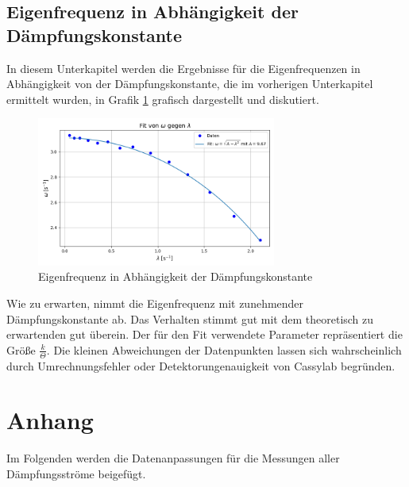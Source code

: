 \documentclass{article}
\begin{document}
\subsection{Eigenfrequenz in Abhängigkeit der Dämpfungskonstante}

In diesem Unterkapitel werden die Ergebnisse für die Eigenfrequenzen in Abhängigkeit von der Dämpfungskonstante, die im vorherigen Unterkapitel ermittelt wurden, in Grafik \ref{fig:Eigenfrequenz} grafisch dargestellt und diskutiert.

\begin{figure}[H]
    \centering
    \includegraphics[width=0.7\textwidth]{Figure_10.png}
    \caption{Eigenfrequenz in Abhängigkeit der Dämpfungskonstante}
    \label{fig:Eigenfrequenz}
\end{figure}

Wie zu erwarten, nimmt die Eigenfrequenz mit zunehmender Dämpfungskonstante ab. Das Verhalten stimmt gut mit dem theoretisch zu erwartenden gut überein. Der für den Fit verwendete Parameter repräsentiert die Größe $\frac{k}{\Theta}$. Die kleinen Abweichungen der Datenpunkten lassen sich wahrscheinlich durch Umrechnungsfehler oder Detektorungenauigkeit von Cassylab begründen.

\section{Anhang}

Im Folgenden werden die Datenanpassungen für die Messungen aller Dämpfungsströme beigefügt.
\end{document}
